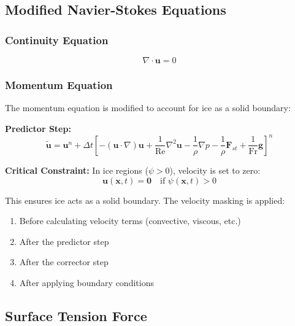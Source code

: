 \documentclass[12pt]{article}
\begin{document}
\subsection{Modified Navier-Stokes Equations}

\subsubsection{Continuity Equation}

\begin{equation}
\nabla \cdot \mathbf{u} = 0
\label{eq:continuity_three}
\end{equation}

\subsubsection{Momentum Equation}

The momentum equation is modified to account for ice as a solid boundary:

\textbf{Predictor Step:}
\begin{equation}
\tilde{\mathbf{u}} = \mathbf{u}^n + \Delta t \left[ -(\mathbf{u} \cdot \nabla)\mathbf{u} + \frac{1}{\text{Re}} \nabla^2 \mathbf{u} - \frac{1}{\rho} \nabla p - \frac{1}{\rho} \mathbf{F}_{st} + \frac{1}{\text{Fr}} \mathbf{g} \right]^n
\label{eq:momentum_predictor_three}
\end{equation}

\textbf{Critical Constraint:} In ice regions ($\psi > 0$), velocity is set to zero:
\begin{equation}
\mathbf{u}(\mathbf{x}, t) = \mathbf{0} \quad \text{if } \psi(\mathbf{x}, t) > 0
\label{eq:ice_velocity_constraint}
\end{equation}

This ensures ice acts as a solid boundary. The velocity masking is applied:
\begin{enumerate}
    \item Before calculating velocity terms (convective, viscous, etc.)
    \item After the predictor step
    \item After the corrector step
    \item After applying boundary conditions
\end{enumerate}

\subsection{Surface Tension Force}
\end{document}
